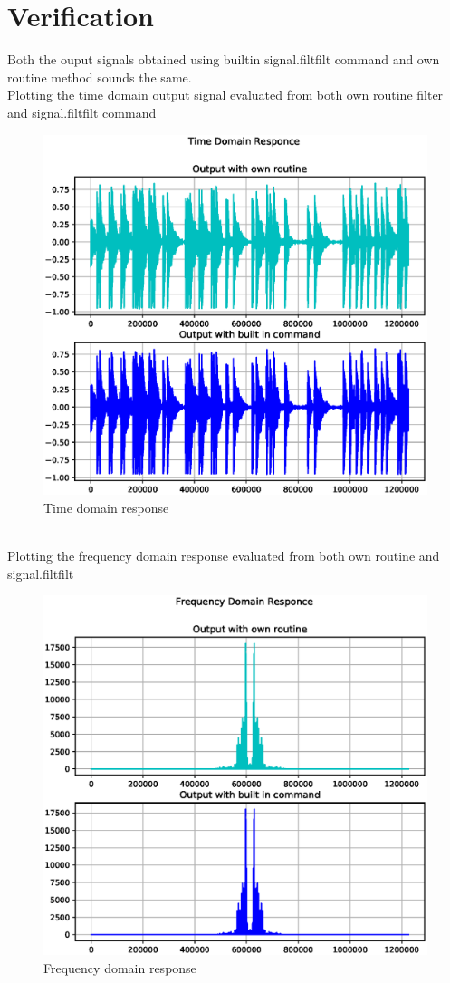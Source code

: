 \documentclass[journal,12pt,twocolumn]{IEEEtran}
\begin{document}
\section{Verification}
Both the ouput signals obtained using builtin signal.filtfilt command and own routine method sounds the same.
\\
Plotting the time domain output signal evaluated from both own routine filter and signal.filtfilt command
\begin{figure}[!h]
\centering
\includegraphics[width=1.2\columnwidth]{figs/ee18btech11037_1.eps}
\caption{Time domain response}
\label{fig:timeresponce}
\end{figure}
\\
Plotting the frequency domain response evaluated from both own routine and signal.filtfilt
\begin{figure}[!h]
\centering
\includegraphics[width=1.2\columnwidth]{figs/ee18btech11037_2.eps}
\caption{Frequency domain response}
\label{fig:freqresponce}
\end{figure}
\end{document}
